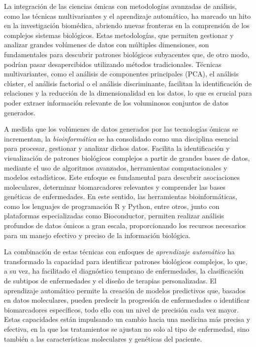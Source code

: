 La integración de las ciencias ómicas con metodologías avanzadas de análisis, como las técnicas multivariantes 
y el aprendizaje automático, ha marcado un hito en la investigación biomédica, abriendo nuevas fronteras en la 
comprensión de los complejos sistemas biológicos. Estas metodologías, que permiten gestionar y analizar grandes 
volúmenes de datos con múltiples dimensiones, son fundamentales para descubrir patrones biológicos subyacentes 
que, de otro modo, podrían pasar desapercibidos utilizando métodos tradicionales. Técnicas multivariantes, como 
el análisis de componentes principales (PCA), el análisis clúster, el análisis factorial o 
el análisis discriminante, facilitan la identificación de relaciones y la reducción de la dimensionalidad en los 
datos, lo que es crucial para poder extraer información relevante de los voluminosos conjuntos de datos generados. \newline

A medida que los volúmenes de datos generados por las tecnologías ómicas se incrementan, la \textit{bioinformática} se ha 
consolidado como una disciplina esencial para procesar, gestionar y analizar dichos datos. Facilita la identificación y 
visualización de patrones biológicos complejos a partir de grandes bases de datos, mediante el uso de algoritmos avanzados,
herramientas computacionales y modelos estadísticos. Este enfoque es fundamental para descubrir asociaciones moleculares, 
determinar biomarcadores relevantes y comprender las bases genéticas de enfermedades. En este sentido, las herramientas
bioinformáticas, como los lenguajes de programación R y Python, entre otros, junto con plataformas especializadas como Bioconductor, 
permiten realizar análisis profundos de datos ómicos a gran escala, proporcionando los recursos necesarios para un 
manejo efectivo y preciso de la información biológica. \newline

La combinación de estas técnicas con enfoques de \textit{aprendizaje automático} ha transformado la capacidad 
para identificar patrones biológicos complejos, lo que, a su vez, ha facilitado el diagnóstico temprano de 
enfermedades, la clasificación de subtipos de enfermedades y el diseño de terapias personalizadas. El aprendizaje 
automático permite la creación de modelos predictivos que, basados en datos moleculares, pueden predecir la 
progresión de enfermedades o identificar biomarcadores específicos, todo ello con un nivel de precisión cada vez 
mayor. Estas capacidades están impulsando un cambio hacia una medicina más precisa y efectiva, en la que los 
tratamientos se ajustan no solo al tipo de enfermedad, sino también a las características moleculares y genéticas 
del paciente.\newline  %

